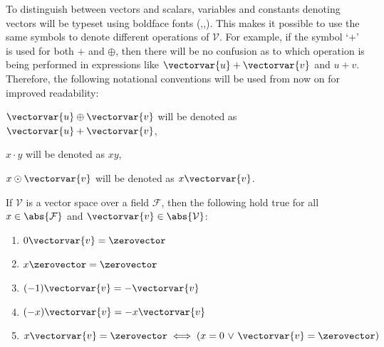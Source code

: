 \begin{notation}
     \label{notation:simplified-notation-for-vector-spaces}
    To distinguish between vectors and scalars, variables and constants denoting vectors will be typeset using boldface fonts
    (,,). This makes it possible to use the same symbols to denote different
    operations of \( \mathcal{V} \).
    For example, if the symbol `\( + \)' is used for both \( + \) and \( \oplus \), then there will be no confusion as to which
    operation is being performed in expressions like \( \vectorvar{u} + \vectorvar{v} \) and \( u + v \). Therefore,
    the following notational conventions will be used from now on for improved readability:
    \begin{enumerate*}[label=(\alph*)]
        \item \( \vectorvar{u} \oplus \vectorvar{v} \) will be denoted as \( \vectorvar{u} + \vectorvar{v} \),
        \item \( x \cdot y \) will be denoted as \( xy \),
        \item \( x \odot \vectorvar{v} \) will be denoted as \( x\vectorvar{v} \).
    \end{enumerate*}
\end{notation}

\begin{thm}
    \label{thm:vector-space-basic-properties}
    If \( \mathcal{V} \) is a vector space over a field \( \mathcal{F} \), then the following hold true for all \( x \in \abs{\mathcal{F}} \)
    and \( \vectorvar{v} \in \abs{\mathcal{V}} \):
    \begin{enumerate}[topsep=2pt,noitemsep,label=\textup{\texttt{(\alph*)}}]
        \item \( 0\vectorvar{v} = \zerovector \) \label{enum:vector-space-0-scalar-multiplication-yields-0-vector}
        \item \( x\zerovector = \zerovector \) \label{enum:vector-space-scalar-multiplication-with-0-vector-yields-zero-vector}
        \item \( \mleft( -1 \mright)\vectorvar{v} = -\vectorvar{v} \) \label{enum:vector-space-negative-1-times-v-yields-negative-v}
        \item \( \mleft( -x \mright)\vectorvar{v} = -x\vectorvar{v} \) \label{enum:vector-space-negative-x-times-v-yields-negative-xv}
        \item \( x\vectorvar{v} = \zerovector \iff \mleft( x = 0 \,\,{\lor}\,\, \vectorvar{v} = \zerovector \mright) \)
            \label{enum:vector-space-xv-equals-zero-vector-iff-x-equals-0-or-v-equals-zero-vector}
    \end{enumerate}
\end{thm}

